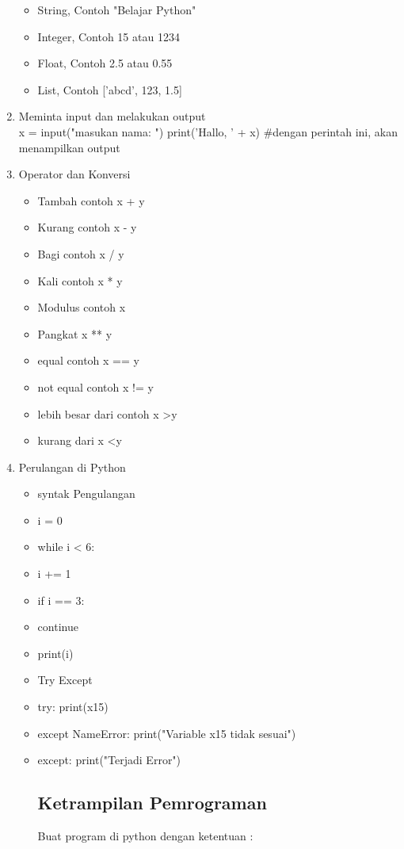 \begin{enumerate}
\begin{itemize}
\item String, Contoh "Belajar Python"
\item Integer, Contoh 15 atau 1234
\item Float, Contoh 2.5 atau 0.55
\item List, Contoh ['abcd', 123, 1.5]
\end{itemize}
\item Meminta input dan melakukan output\\
x = input("masukan nama: ")
print('Hallo, ' + x) \#dengan perintah ini, akan menampilkan output
\item Operator dan Konversi
\begin{itemize}
\item Tambah contoh x + y
\item Kurang contoh x - y
\item Bagi contoh x / y
\item Kali contoh x * y
\item Modulus contoh x %
\item Pangkat x ** y
\item equal contoh x == y
\item not equal contoh x != y
\item lebih besar dari contoh x \textgreater y
\item kurang dari x \textless y
\end{itemize}
\item Perulangan di Python
\begin{itemize}
\item syntak Pengulangan
\item i = 0
\item while i < 6:
\item  i += 1 
 \item if i == 3:
   \item continue
 \item print(i)
\end{itemize}
\begin{itemize}
\item Try Except
\item try:
  print(x15)
\item except NameError:
  print("Variable x15 tidak sesuai")
\item except:
  print("Terjadi Error")

\subsection{Ketrampilan Pemrograman}
Buat program di python dengan ketentuan :


\end{itemize}
\end{enumerate}
